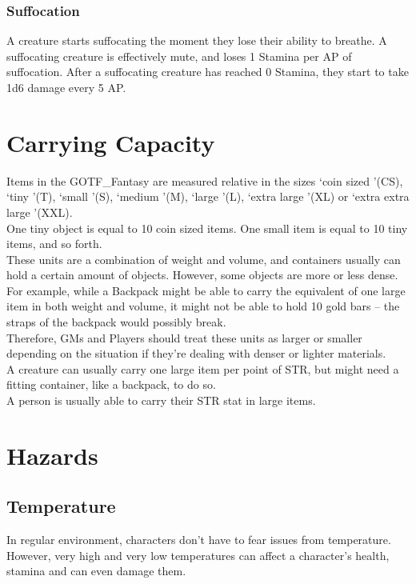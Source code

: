 \subsubsection{Suffocation}\label{subsubsec:suffocation}
A creature starts suffocating the moment they lose their ability to breathe.
A suffocating creature is effectively mute, and loses 1 Stamina per AP of suffocation.
After a suffocating creature has reached 0 Stamina, they start to take 1d6 damage every 5 AP.

\section{Carrying Capacity}\label{sec:carryingCapacity}
Items in the GOTF\_Fantasy are measured relative in the sizes \lq coin sized \rq (CS), \lq tiny \rq (T), \lq small \rq (S), \lq medium \rq (M), \lq large \rq (L), \lq extra large \rq (XL) or \lq extra extra large \rq (XXL).\\
One tiny object is equal to 10 coin sized items.
One small item is equal to 10 tiny items, and so forth.\\
These units are a combination of weight and volume, and containers usually can hold a certain amount of objects.
However, some objects are more or less dense.
For example, while a Backpack might be able to carry the equivalent of one large item in both weight and volume, it might not be able to hold 10 gold bars -- the straps of the backpack would possibly break.\\
Therefore, GMs and Players should treat these units as larger or smaller depending on the situation if they're dealing with denser or lighter materials.\\
A creature can usually carry one large item per point of STR, but might need a fitting container, like a backpack, to do so.\\

A person is usually able to carry their STR stat in large items.\\

\section{Hazards}\label{sec:hazards}
\subsection{Temperature}\label{subsec:temperature}
In regular environment, characters don't have to fear issues from temperature.
However, very high and very low temperatures can affect a character's health, stamina and can even damage them.\\

